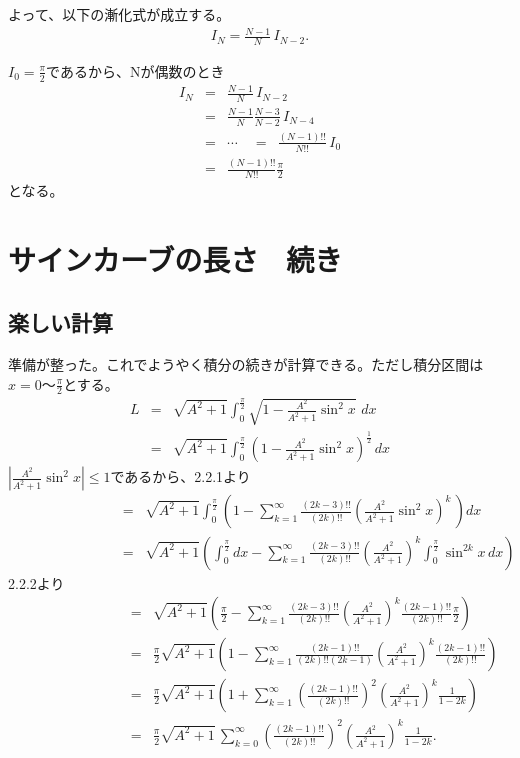 よって、以下の漸化式が成立する。
\begin{eqnarray*}
I_N = \frac{N - 1}{N}\,I_{N - 2}.
\end{eqnarray*}

$I_0=\frac{\pi}{2}$であるから、Nが偶数のとき
\begin{eqnarray*}
I_N & = & \frac{N - 1}{N}\,I_{N - 2} \\
& = & \frac{N - 1}{N}\frac{N - 3}{N - 2}\,I_{N - 4} \\
& = & \cdots \quad=\,\,\, \frac{(N - 1)!!}{N!!}\,I_0 \\
& = & \frac{(N - 1)!!}{N!!}\frac{\pi}{2}
\end{eqnarray*}
となる。


\section{サインカーブの長さ　続き}

\subsection{楽しい計算}

準備が整った。これでようやく積分の続きが計算できる。ただし積分区間は$x=0〜\frac{\pi}{2}$とする。
\begin{eqnarray*}
L & = & \sqrt{A^2 + 1} \int_0^\frac{\pi}{2} \sqrt{1 - \frac{A^2}{A^2 + 1}\sin^2 x}\,\,dx \\
& = & \sqrt{A^2 + 1} \int_0^\frac{\pi}{2} \left(1 - \frac{A^2}{A^2 + 1}\sin^2 x \right)^\frac{1}{2}\,dx
\end{eqnarray*}
$|\frac{A^2}{A^2 + 1}\sin^2 x| \leq 1$であるから、2.2.1より
\begin{eqnarray*}
\qquad\qquad\qquad\quad & = & \sqrt{A^2 + 1} \int_0^\frac{\pi}{2}\left(1 - \sum^{\infty}_{k = 1}\frac{(2k - 3)!!}{(2k)!!}\left(\frac{A^2}{A^2 + 1}\sin^2 x\right)^k\,\right)dx \\
& = & \sqrt{A^2 + 1} \left(\int_0^\frac{\pi}{2}dx - \sum^{\infty}_{k = 1}\frac{(2k - 3)!!}{(2k)!!}\left(\frac{A^2}{A^2 + 1}\right)^k \int_0^\frac{\pi}{2}\sin^{2k}x\,dx \right)
\end{eqnarray*}
2.2.2より
\begin{eqnarray*}
\qquad\qquad\qquad\quad & = & \sqrt{A^2 + 1} \left(\frac{\pi}{2} - \sum^{\infty}_{k = 1}\frac{(2k - 3)!!}{(2k)!!}\left(\frac{A^2}{A^2 + 1}\right)^k\frac{(2k - 1)!!}{(2k)!!}\frac{\pi}{2} \right)\\
& = & \frac{\pi}{2}\sqrt{A^2 + 1} \left(1 - \sum^{\infty}_{k = 1}\frac{(2k - 1)!!}{(2k)!!(2k - 1)}\left(\frac{A^2}{A^2 + 1}\right)^k\frac{(2k - 1)!!}{(2k)!!}\right) \\
& = & \frac{\pi}{2}\sqrt{A^2 + 1} \left(1 + \sum^{\infty}_{k = 1}\left(\frac{(2k - 1)!!}{(2k)!!}\right)^2 \left(\frac{A^2}{A^2 + 1}\right)^k\frac{1}{1 - 2k} \right) \\
& = & \frac{\pi}{2}\sqrt{A^2 + 1}\,\sum^{\infty}_{k = 0}\left(\frac{(2k - 1)!!}{(2k)!!}\right)^2 \left(\frac{A^2}{A^2 + 1}\right)^k\frac{1}{1 - 2k}.
\end{eqnarray*}


